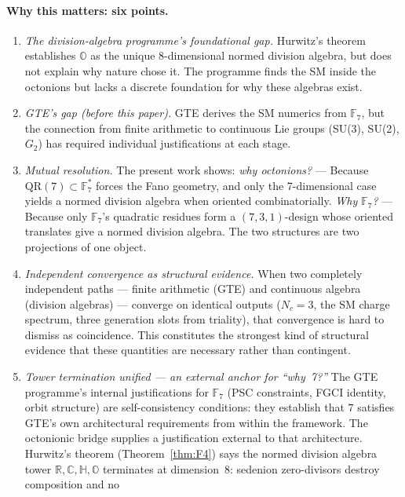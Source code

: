 \documentclass[11pt]{article}
\theoremstyle{remark}
\begin{document}
\paragraph{Why this matters: six points.}
\begin{enumerate}[noitemsep]
  \item \textit{The division-algebra programme's foundational gap.}
    Hurwitz's theorem establishes $\mathbb{O}$ as the unique
    8-dimensional normed division algebra, but does not explain why nature
    chose it. The programme finds the SM inside the octonions but lacks a discrete
    foundation for why these algebras exist.
  \item \textit{GTE's gap (before this paper).}
    GTE derives the SM numerics from $\mathbb{F}_7$, but the connection from
    finite arithmetic to continuous Lie groups (SU(3), SU(2), $G_2$)
    has required individual justifications at each stage.
  \item \textit{Mutual resolution.}
    The present work shows: \emph{why octonions?} --- Because
    $\mathrm{QR}(7)\subset\mathbb{F}_7^*$ forces the Fano geometry, and
    only the 7-dimensional case yields a normed division algebra when oriented
    combinatorially. \emph{Why $\mathbb{F}_7$?} --- Because only $\mathbb{F}_7$'s
    quadratic residues form a $(7,3,1)$-design whose oriented translates give
    a normed division algebra. The two structures are two projections of one object.
  \item \textit{Independent convergence as structural evidence.}
    When two completely independent paths --- finite arithmetic (GTE) and
    continuous algebra (division algebras) --- converge on identical outputs
    ($N_c=3$, the SM charge spectrum, three generation slots from triality),
    that convergence is hard to dismiss as coincidence. This constitutes
    the strongest kind of structural evidence that these quantities are necessary
    rather than contingent.
  \item \textit{Tower termination unified --- an external anchor for ``why~7?''}
    The GTE programme's internal justifications for $\mathbb{F}_7$
    (PSC constraints, FGCI identity, orbit structure) are self-consistency
    conditions: they establish that $7$ satisfies GTE's own architectural
    requirements from within the framework.
    The octonionic bridge supplies a justification external to that architecture.
    Hurwitz's theorem (Theorem~\ref{thm:F4}) says the normed division algebra
    tower $\mathbb{R},\mathbb{C},\mathbb{H},\mathbb{O}$ terminates at
    dimension~8: sedenion zero-divisors destroy composition and no

\end{enumerate}
\end{document}
